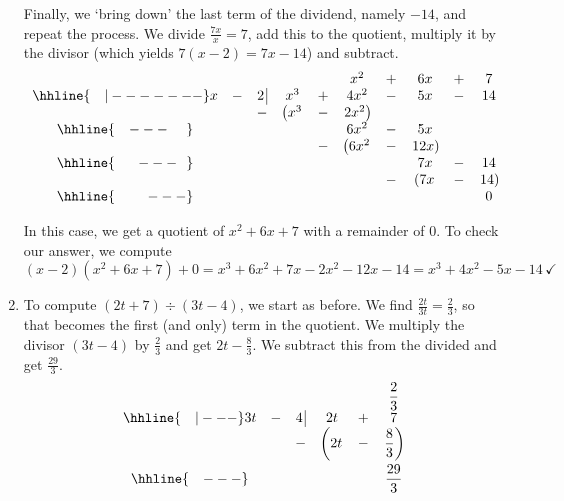 \documentclass{ximera}
\begin{document}
\begin{ex}
\begin{enumerate}
Finally, we `bring down' the last term of the dividend, namely $-14$, and repeat the process.  We divide $\frac{7x}{x} = 7$, add this to the quotient, multiply it by the divisor (which yields $7(x - 2) = 7x - 14$) and subtract.\setlength\arraycolsep{0.1pt}\setlength\extrarowheight{2pt}\[ \begin{array}{cccccccccc}

& & & & & x^2 & + & 6x & + & 7 \\ \hhline{~~~|-------}

x & - & 2 \, \vline& x^3 & + & 4x^2 & - & 5x & - & 14 \\

 &  &  -& \left(x^3 \right. & - & \left.  2x^2\right) &  &  &  &  \\ \hhline{~~~---~~~~} 
 &  &  &   &  & 6 x^2 & - & 5x &  &  \\ 
 &  &  &   & - & \left(6 x^2 \right. & - & \left. 12x \right) &  &  \\ \hhline{~~~~~---~~} 
 &  &  &   &   &  & & 7x  & - & 14 \\
 &  &  &   &   &  & - & \left( 7x \right. & - & \left. 14 \right) \\ \hhline{~~~~~~~---} 
 &   &  &  &  &  &  &  &  & 0
 
\end{array}\]
\setlength\arraycolsep{5pt}
\setlength\extrarowheight{0pt}

In this case, we get a quotient of $x^2 + 6x + 7$ with a remainder of $0$.  To check our answer, we compute  \[(x-2)\left(x^2 + 6x + 7\right) + 0 = x^3 + 6x^2 + 7x - 2x^2 - 12x -14 =  x^3 + 4x^2 - 5x - 14 \, \checkmark \]


\item    To compute  $\left(2t +  7\right) \div \left(3t - 4\right)$, we start as before.  We find $\frac{2t}{3t} = \frac{2}{3}$, so that becomes the first (and only) term in the quotient.  We multiply the divisor $(3t-4)$ by $\frac{2}{3}$ and get $2t - \frac{8}{3}$.  We subtract this from the divided and get $\frac{29}{3}$.\setlength\arraycolsep{0.1pt}\setlength\extrarowheight{5pt}\[ \begin{array}{cccccc}

& & & & & \dfrac{2}{3} \\ \hhline{~~~|---}

3t & - & 4 \, \vline& 2t & + & 7  \\

 &  &  -& \left(2t\vphantom{\dfrac{8}{3}} \right. & - & \left.  \dfrac{8}{3}\right)  \\ \hhline{~~~---}
 &  &  &   &  & \dfrac{29}{3} \vphantom{\sqrt{\dfrac{7}{7}}} \\ 


\end{array}\]
\end{enumerate}
\end{ex}
\end{document}
